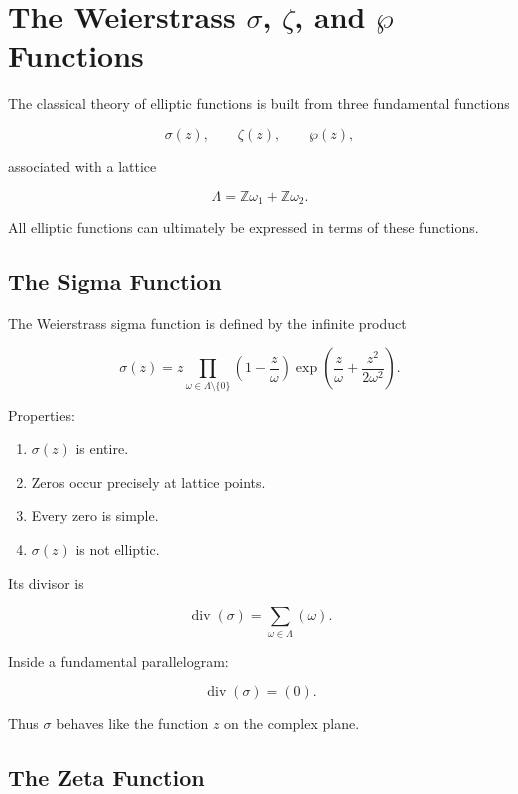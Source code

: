\documentclass[12pt,a4paper]{article}
\theoremstyle{notespace}
\begin{document}
\section{The Weierstrass \texorpdfstring{\(\sigma\)}{sigma},
	\texorpdfstring{\(\zeta\)}{zeta},
	and \texorpdfstring{\(\wp\)}{wp} Functions}

The classical theory of elliptic functions is built from three fundamental functions

\[
\sigma(z),
\qquad
\zeta(z),
\qquad
\wp(z),
\]

associated with a lattice

\[
\Lambda
=
\mathbb Z\omega_1+\mathbb Z\omega_2.
\]

All elliptic functions can ultimately be expressed in terms of these functions.

\subsection{The Sigma Function}

The Weierstrass sigma function is defined by the infinite product

\[
\sigma(z)
=
z
\prod_{\omega\in\Lambda\setminus\{0\}}
\left(
1-\frac{z}{\omega}
\right)
\exp
\left(
\frac{z}{\omega}
+
\frac{z^2}{2\omega^2}
\right).
\]

Properties:

\begin{enumerate}
	\item \(\sigma(z)\) is entire.
	
	\item Zeros occur precisely at lattice points.
	
	\item Every zero is simple.
	
	\item \(\sigma(z)\) is not elliptic.
\end{enumerate}

Its divisor is

\[
\operatorname{div}(\sigma)
=
\sum_{\omega\in\Lambda}
(\omega).
\]

Inside a fundamental parallelogram:

\[
\operatorname{div}(\sigma)
=
(0).
\]

Thus \(\sigma\) behaves like the function \(z\) on the complex plane.

\subsection{The Zeta Function}
\end{document}
